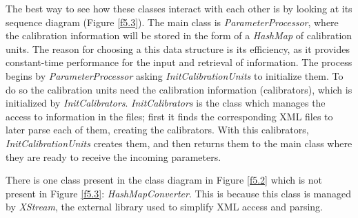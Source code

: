 The best way to see how these classes interact with each other is by looking at its sequence diagram (Figure \ref{f5.3}). The main class is \emph{ParameterProcessor}, where the calibration information will be stored in the form of a \emph{HashMap} of calibration units. The reason for choosing a this data structure is its efficiency, as it provides constant-time performance for the input and retrieval of information\cite{HashMap}. The process begins by \emph{ParameterProcessor} asking \emph{InitCalibrationUnits} to initialize them. To do so the calibration units need the calibration information (calibrators), which is initialized  by \emph{InitCalibrators}. \emph{InitCalibrators} is the class which manages the access to information in the files; first it finds the corresponding XML files to later parse each of them, creating the calibrators. With this calibrators, \emph{InitCalibrationUnits} creates them, and then returns them to the main class where they are ready to receive the incoming parameters.

There is one class present in the class diagram in Figure \ref{f5.2} which is not present in Figure \ref{f5.3}: \emph{HashMapConverter}. This is because this class is managed by \emph{XStream}, the external library used to simplify XML access and parsing. 


